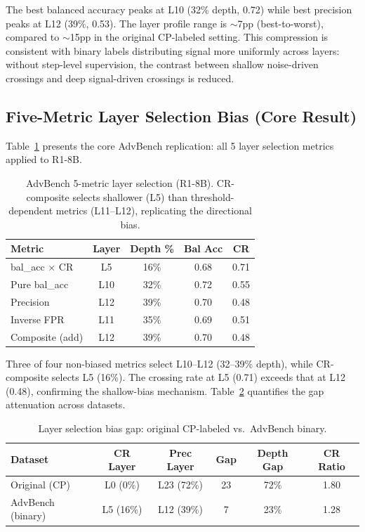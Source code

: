 \documentclass[11pt]{article}
\begin{document}
The best balanced accuracy peaks at L10 (32\% depth, 0.72) while best precision peaks at L12 (39\%, 0.53). The layer profile range is $\sim$7pp (best-to-worst), compared to $\sim$15pp in the original CP-labeled setting. This compression is consistent with binary labels distributing signal more uniformly across layers: without step-level supervision, the contrast between shallow noise-driven crossings and deep signal-driven crossings is reduced.

\subsection{Five-Metric Layer Selection Bias (Core Result)}
\label{sec:five-metric}

Table~\ref{tab:five-metric} presents the core AdvBench replication: all 5 layer selection metrics applied to R1-8B.

\begin{table}[t]
\centering
\small
\caption{AdvBench 5-metric layer selection (R1-8B). CR-composite selects shallower (L5) than threshold-dependent metrics (L11--L12), replicating the directional bias.}
\label{tab:five-metric}
\begin{tabular}{lcccc}
\toprule
Metric & Layer & Depth \% & Bal Acc & CR \\
\midrule
bal\_acc $\times$ CR & L5 & 16\% & 0.68 & 0.71 \\
Pure bal\_acc & L10 & 32\% & 0.72 & 0.55 \\
Precision & L12 & 39\% & 0.70 & 0.48 \\
Inverse FPR & L11 & 35\% & 0.69 & 0.51 \\
Composite (add) & L12 & 39\% & 0.70 & 0.48 \\
\bottomrule
\end{tabular}
\end{table}

Three of four non-biased metrics select L10--L12 (32--39\% depth), while CR-composite selects L5 (16\%). The crossing rate at L5 (0.71) exceeds that at L12 (0.48), confirming the shallow-bias mechanism. Table~\ref{tab:bias-gap} quantifies the gap attenuation across datasets.

\begin{table}[t]
\centering
\small
\caption{Layer selection bias gap: original CP-labeled vs.\ AdvBench binary.}
\label{tab:bias-gap}
\begin{tabular}{lccccc}
\toprule
Dataset & CR Layer & Prec Layer & Gap & Depth Gap & CR Ratio \\
\midrule
Original (CP) & L0 (0\%) & L23 (72\%) & 23 & 72\% & 1.80 \\
AdvBench (binary) & L5 (16\%) & L12 (39\%) & 7 & 23\% & 1.28 \\
\bottomrule
\end{tabular}
\end{table}
\end{document}
